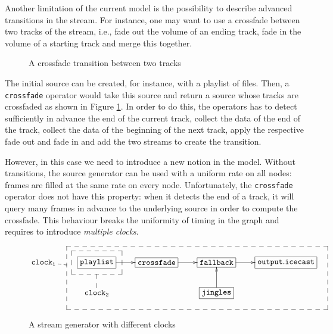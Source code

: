 \documentclass{llncs}
\newcommand{\ie}{{i.e.,}}
\begin{document}

Another limitation of the current model is the possibility to describe advanced transitions in 
the stream. For instance, one may want to use a crossfade between two tracks 
of the stream, \ie{}
fade out the volume of an ending track, fade in the volume of a starting track and merge this together.

\begin{figure}[htn]
 \begin{center}
\end{center}
 \caption{A crossfade transition between two tracks}
 \label{cross-fig}
\end{figure}

The initial source can be created, for instance, with a playlist of files. Then,
a \texttt{crossfade} operator would take this source and return a source whose tracks are 
crossfaded as shown in Figure \ref{cross-fig}. In order to do this, the operators has to 
detect sufficiently in advance the end of the current track, collect the data of the
end of the track, collect the data of the beginning of the next track, apply the respective
fade out and fade in and add the two streams to create the transition.

However, in this case we need to introduce a new notion in the model. Without transitions, the 
source generator can be used with a uniform rate on all nodes: frames are filled
at the same rate on every node. Unfortunately, the \texttt{crossfade} operator
does not have this property: when it detects the end of a track, it will query many frames in advance 
to the underlying source in order to compute the crossfade. This behaviour breaks the uniformity of 
timing in the graph and requires to introduce \textit{multiple clocks}.


\begin{figure}[htn]
 \begin{center}
\[
\def\f{\save
*+<15pt>[F--]\frm{}\ar @{--} "2,2"\restore}%
\def\g{\save
"2,4"."1,2"."1,5"!C*+<27pt>[F--]\frm{}\ar @{--} "1,1"\restore}%
\xymatrix{
   \mathtt{clock_1} & *+[F]{\mathtt{playlist}}\ar[r]\f&*+[F]{\mathtt{crossfade}}\ar[r]&  *+[F]{\mathtt{fallback}}\ar[r]&
  *+[F]{\mathtt{output.icecast}}\\
   &\mathtt{clock_2} &  & *+[F]{\mathtt{jingles}}\ar[u]\g& 
}
\]
\end{center}
 \caption{A stream generator with different clocks}
\end{figure}
\end{document}
